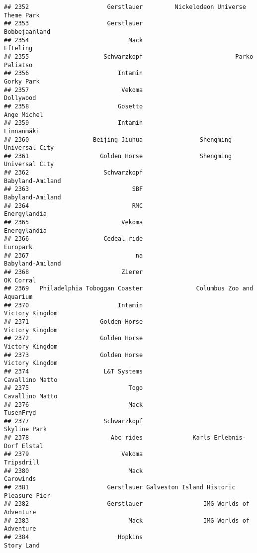\documentclass[
]{article}
\begin{document}
\begin{verbatim}
## 2352                      Gerstlauer         Nickelodeon Universe Theme Park
## 2353                      Gerstlauer                           Bobbejaanland
## 2354                            Mack                                Efteling
## 2355                     Schwarzkopf                          Parko Paliatso
## 2356                         Intamin                              Gorky Park
## 2357                          Vekoma                               Dollywood
## 2358                         Gosetto                             Ange Michel
## 2359                         Intamin                              Linnanmäki
## 2360                  Beijing Jiuhua                Shengming Universal City
## 2361                    Golden Horse                Shengming Universal City
## 2362                     Schwarzkopf                        Babyland-Amiland
## 2363                             SBF                        Babyland-Amiland
## 2364                             RMC                            Energylandia
## 2365                          Vekoma                            Energylandia
## 2366                     Cedeal ride                                Europark
## 2367                              na                        Babyland-Amiland
## 2368                          Zierer                               OK Corral
## 2369   Philadelphia Toboggan Coaster               Columbus Zoo and Aquarium
## 2370                         Intamin                         Victory Kingdom
## 2371                    Golden Horse                         Victory Kingdom
## 2372                    Golden Horse                         Victory Kingdom
## 2373                    Golden Horse                         Victory Kingdom
## 2374                     L&T Systems                         Cavallino Matto
## 2375                            Togo                         Cavallino Matto
## 2376                            Mack                               TusenFryd
## 2377                     Schwarzkopf                            Skyline Park
## 2378                       Abc rides              Karls Erlebnis-Dorf Elstal
## 2379                          Vekoma                              Tripsdrill
## 2380                            Mack                               Carowinds
## 2381                      Gerstlauer Galveston Island Historic Pleasure Pier
## 2382                      Gerstlauer                 IMG Worlds of Adventure
## 2383                            Mack                 IMG Worlds of Adventure
## 2384                         Hopkins                              Story Land

\end{verbatim}
\end{document}
